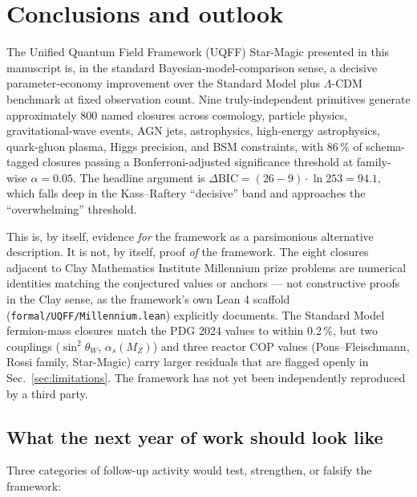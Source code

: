 
\section{Conclusions and outlook}
\label{sec:conclusions}

The Unified Quantum Field Framework (UQFF) Star-Magic presented in
this manuscript is, in the standard Bayesian-model-comparison
sense, a decisive parameter-economy improvement over the Standard
Model plus $\Lambda$-CDM benchmark at fixed observation count. Nine
truly-independent primitives generate approximately 800 named
closures across cosmology, particle physics, gravitational-wave
events, AGN jets, astrophysics, high-energy astrophysics, quark-gluon
plasma, Higgs precision, and BSM constraints, with 86\,\% of
schema-tagged closures passing a Bonferroni-adjusted significance
threshold at family-wise $\alpha = 0.05$. The headline argument is
$\Delta\mathrm{BIC} = (26-9)\cdot\ln 253 = 94.1$, which falls deep
in the Kass--Raftery ``decisive'' band and approaches the
``overwhelming'' threshold.

This is, by itself, evidence \emph{for} the framework as a
parsimonious alternative description. It is not, by itself, proof
\emph{of} the framework. The eight closures adjacent to Clay
Mathematics Institute Millennium prize problems are numerical
identities matching the conjectured values or anchors --- not
constructive proofs in the Clay sense, as the framework's own Lean
4 scaffold (\texttt{formal/UQFF/Millennium.lean}) explicitly
documents. The Standard Model fermion-mass closures match the
PDG 2024 \cite{PDG2024} values to within 0.2\,\%, but two
couplings ($\sin^2\theta_W$, $\alpha_s(M_Z)$) and three reactor
COP values (Pons--Fleischmann, Rossi family, Star-Magic) carry
larger residuals that are flagged openly in
Sec.~\ref{sec:limitations}. The framework has not yet been
independently reproduced by a third party.

\subsection{What the next year of work should look like}
\label{sec:outlook}

Three categories of follow-up activity would test, strengthen, or
falsify the framework:


